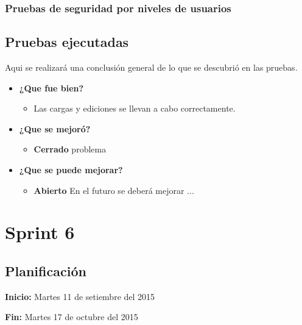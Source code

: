 \documentclass[a4paper,12pt]{article}
\begin{document}
\subsubsection{ Pruebas de seguridad por niveles de usuarios}


\subsection{Pruebas ejecutadas}
Aqui se realizará una conclusión general de lo que se descubrió en las pruebas.
	\begin{itemize}
		\item \textbf{¿Que fue bien?}
        	\begin{itemize}
				\item        Las cargas y ediciones se llevan a cabo correctamente.
			\end{itemize}

   		\item \textbf{¿Que se mejoró?}
        	\begin{itemize}
                \item \textbf{Cerrado} problema
			\end{itemize}

   		\item \textbf{¿Que se puede mejorar?}
        	\begin{itemize}
		        \item \textbf{Abierto} En el futuro se deberá mejorar ...
            \end{itemize}
        

	\end{itemize}





\section{Sprint 6} %
\subsection{Planificación}

\textbf{Inicio: }Martes 11 de setiembre del 2015 

\textbf{Fin:} Martes 17 de octubre del 2015
\end{document}
